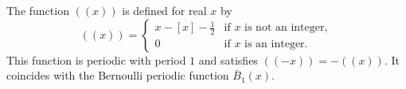 The function $((x))$ is defined for real $x$ by
$$((x)) = \begin{cases} x - [x] - \frac{1}{2} & \text{if } x \text{ is not an integer}, \\ 0 & \text{if } x \text{ is an integer}. \end{cases}$$
This function is periodic with period $1$ and satisfies $((-x)) = -((x))$. It coincides with the Bernoulli periodic function $\bar{B}_1(x)$.
